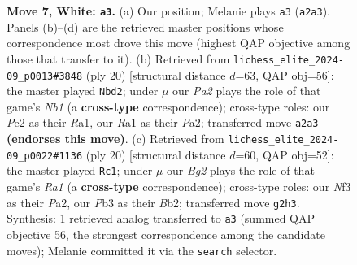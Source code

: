\documentclass[11pt]{article}
\begin{document}
\begin{figure}[p]
\caption{\textbf{Move 7, White: \texttt{a3}.} (a) Our position; Melanie plays \texttt{a3} (\texttt{a2a3}). Panels (b)--(d) are the retrieved master positions whose correspondence most drove this move (highest QAP objective among those that transfer to it). (b) Retrieved from \texttt{lichess\_elite\_2024-09\_p0013\#3848} (ply 20) [structural distance $d$=63, QAP obj=56]: the master played \texttt{Nbd2}; under $\mu$ our \emph{Pa2} plays the role of that game's \emph{Nb1} (a \textbf{cross-type} correspondence); cross-type roles: our \emph{P}e2 as their \emph{R}a1, our \emph{R}a1 as their \emph{P}a2; transferred move \texttt{a2a3} \textbf{(endorses this move)}. (c) Retrieved from \texttt{lichess\_elite\_2024-09\_p0022\#1136} (ply 20) [structural distance $d$=60, QAP obj=52]: the master played \texttt{Rc1}; under $\mu$ our \emph{Bg2} plays the role of that game's \emph{Ra1} (a \textbf{cross-type} correspondence); cross-type roles: our \emph{N}f3 as their \emph{P}a2, our \emph{P}b3 as their \emph{B}b2; transferred move \texttt{g2h3}. Synthesis: 1 retrieved analog transferred to \texttt{a3} (summed QAP objective 56, the strongest correspondence among the candidate moves); Melanie committed it via the \texttt{search} selector.}
\label{fig:thought-m12}
\end{figure}

\clearpage
\end{document}
